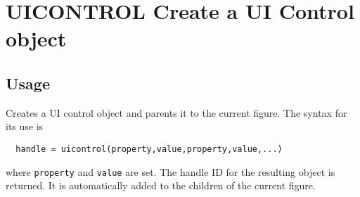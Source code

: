 \section{UICONTROL Create a UI Control object}

\subsection{Usage}

Creates a UI control object and parents it to the current figure.  The
syntax for its use is
\begin{verbatim}
  handle = uicontrol(property,value,property,value,...)
\end{verbatim}
where \verb|property| and \verb|value| are set.  The handle ID for the
resulting object is returned.  It is automatically added to
the children of the current figure.
